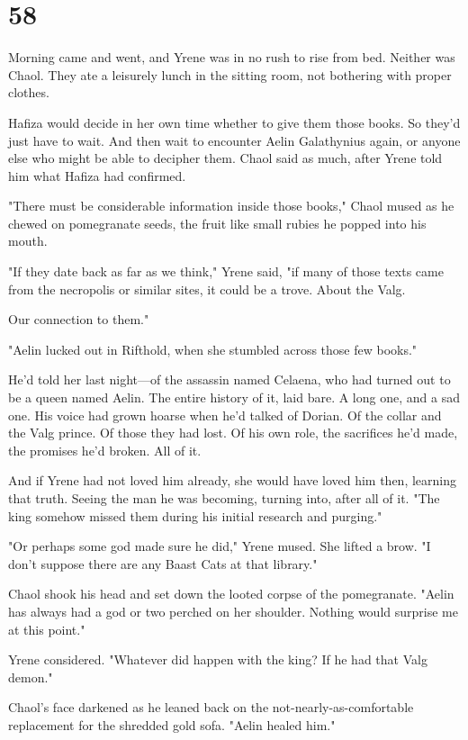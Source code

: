
\chapter{58}

Morning came and went, and Yrene was in no rush to rise from bed. Neither was Chaol. They ate a leisurely lunch in the sitting room, not bothering with proper clothes.

Hafiza would decide in her own time whether to give them those books. So they'd just have to wait. And then wait to encounter Aelin Galathynius again, or anyone else who might be able to decipher them. Chaol said as much, after Yrene told him what Hafiza had confirmed.

"There must be considerable information inside those books," Chaol mused as he chewed on pomegranate seeds, the fruit like small rubies he popped into his mouth.

"If they date back as far as we think," Yrene said, "if many of those texts came from the necropolis or similar sites, it could be a trove. About the Valg.

Our connection to them."

"Aelin lucked out in Rifthold, when she stumbled across those few books."

He'd told her last night---of the assassin named Celaena, who had turned out to be a queen named Aelin. The entire history of it, laid bare. A long one, and a sad one. His voice had grown hoarse when he'd talked of Dorian. Of the collar and the Valg prince. Of those they had lost. Of his own role, the sacrifices he'd made, the promises he'd broken. All of it.

And if Yrene had not loved him already, she would have loved him then, learning that truth. Seeing the man he was becoming, turning into, after all of it. "The king somehow missed them during his initial research and purging."

"Or perhaps some god made sure he did," Yrene mused. She lifted a brow. "I don't suppose there are any Baast Cats at that library."

Chaol shook his head and set down the looted corpse of the pomegranate. "Aelin has always had a god or two perched on her shoulder. Nothing would surprise me at this point."

Yrene considered. "Whatever did happen with the king? If he had that Valg demon."

Chaol's face darkened as he leaned back on the not-nearly-as-comfortable replacement for the shredded gold sofa. "Aelin healed him."


